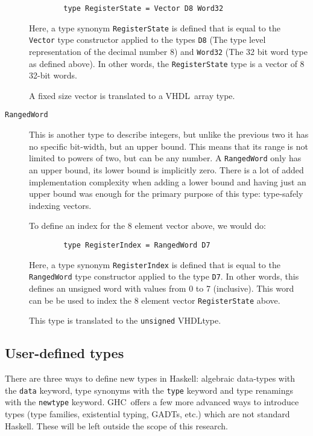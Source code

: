 \documentclass[conference]{IEEEtran}
\def\VHDL{\textsc{VHDL}}
\def\GHC{\textsc{GHC}}
\def\hs#1{\texttt{#1}}
\begin{document}
\begin{description}
        \begin{verbatim}
        type RegisterState = Vector D8 Word32
        \end{verbatim}

        Here, a type synonym \hs{RegisterState} is defined that is equal to
        the \hs{Vector} type constructor applied to the types \hs{D8} (The type
        level representation of the decimal number 8) and \hs{Word32} (The 32
        bit word type as defined above). In other words, the
        \hs{RegisterState} type is a vector of 8 32-bit words.

        A fixed size vector is translated to a \VHDL\ array type.
      \item[\hs{RangedWord}]
        This is another type to describe integers, but unlike the previous
        two it has no specific bit-width, but an upper bound. This means that
        its range is not limited to powers of two, but can be any number.
        A \hs{RangedWord} only has an upper bound, its lower bound is
        implicitly zero. There is a lot of added implementation complexity
        when adding a lower bound and having just an upper bound was enough
        for the primary purpose of this type: type-safely indexing vectors.

        To define an index for the 8 element vector above, we would do:

        \begin{verbatim}
        type RegisterIndex = RangedWord D7
        \end{verbatim}

        Here, a type synonym \hs{RegisterIndex} is defined that is equal to
        the \hs{RangedWord} type constructor applied to the type \hs{D7}. In
        other words, this defines an unsigned word with values from
        0 to 7 (inclusive). This word can be be used to index the
        8 element vector \hs{RegisterState} above.

        This type is translated to the \texttt{unsigned} \VHDL type.
    \end{description}
  \subsection{User-defined types}
    There are three ways to define new types in Haskell: algebraic
    data-types with the \hs{data} keyword, type synonyms with the \hs{type}
    keyword and type renamings with the \hs{newtype} keyword. \GHC\
    offers a few more advanced ways to introduce types (type families,
    existential typing, \small{GADT}s, etc.) which are not standard
    Haskell.  These will be left outside the scope of this research.
\end{document}

